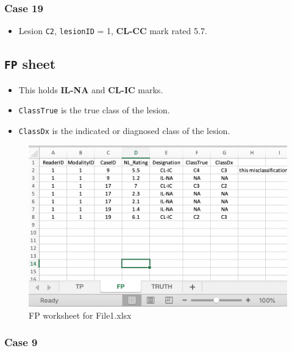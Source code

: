 \documentclass[
]{book}
\providecommand{\tightlist}{%
  \setlength{\itemsep}{0pt}\setlength{\parskip}{0pt}}
\begin{document}
\hypertarget{classification-tasks-example1-case19}{%
\subsubsection{Case 19}\label{classification-tasks-example1-case19}}

\begin{itemize}
\tightlist
\item
  Lesion \texttt{C2}, \texttt{lesionID} = 1, \textbf{CL-CC} mark rated 5.7.
\end{itemize}

\hypertarget{classification-tasks-example1-fp}{%
\subsection{\texorpdfstring{\texttt{FP} sheet}{FP sheet}}\label{classification-tasks-example1-fp}}

\begin{itemize}
\tightlist
\item
  This holds \textbf{IL-NA} and \textbf{CL-IC} marks.
\item
  \texttt{ClassTrue} is the true class of the lesion.
\item
  \texttt{ClassDx} is the indicated or diagnosed class of the lesion.
\end{itemize}

\begin{figure}

{\centering \includegraphics[width=0.5\linewidth,height=0.2\textheight]{images/classification/File1FP} 

}

\caption{FP worksheet for File1.xlsx}\label{fig:File1FP}
\end{figure}

\hypertarget{classification-tasks-example1-fp-case9}{%
\subsubsection{Case 9}\label{classification-tasks-example1-fp-case9}}
\end{document}
